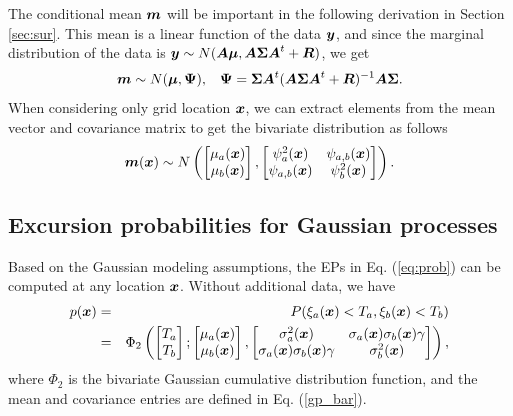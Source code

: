 \documentclass[aoas]{imsart}
\begin{document}
The conditional mean ${\boldsymbol m}$ will be important in the following derivation in Section \ref{sec:sur}. This mean is a linear function of the data ${\boldsymbol y}$, and since the marginal distribution of the data is ${\boldsymbol y} \sim N( {\boldsymbol A} {\boldsymbol \mu},{\boldsymbol A} {\boldsymbol \Sigma} {\boldsymbol A}^t+{\boldsymbol R})$, we get
\begin{equation}\label{distxi}
\bm \sim N(\bmu , \bPsi), \hspace{3mm} \bPsi=\bSigma \bA^t (\bA \bSigma \bA^t+\bR)^{-1} \bA \bSigma.  
\end{equation}
When considering only grid location ${\boldsymbol x}$, we can extract elements from the mean vector and covariance matrix to get the bivariate distribution as follows 
\begin{equation}\label{dist_mxi}
\bm(\bx) \sim N 
\left( 
\begin{bmatrix}
\mu_{a}(\bx) \\
\mu_{b}(\bx)
\end{bmatrix},
\begin{bmatrix}
\psi^2_{a}(\bx) & \psi_{a,b}(\bx)\\
\psi_{a,b}(\bx) & \psi^2_{b}(\bx)
\end{bmatrix}
\right).
\end{equation}


\subsection{Excursion probabilities for Gaussian processes}

Based on the Gaussian modeling assumptions, the EPs in Eq. (\ref{eq:prob}) can be computed at any location ${\boldsymbol x}$. Without additional data, we have
\begin{eqnarray}\label{eq:prob_mv0}
 p(\bx) &=& P(\xi_a(\bx) < T_a, \xi_b(\bx) < T_b) \nonumber \\
 &=& \Phi_2 \begin{pmatrix} 
\begin{bmatrix} T_a\\
T_b
\end{bmatrix};
\begin{bmatrix} \mu_{a}(\bx)\\
\mu_{b}(\bx)
\end{bmatrix},\begin{bmatrix}
\sigma_{a}^2(\bx) & \sigma_{a}(\bx)\sigma_{b}(\bx) \gamma  \\
\sigma_{a}(\bx)\sigma_{b}(\bx) \gamma  & \sigma_{b}^2(\bx)  
\end{bmatrix}\end{pmatrix},
\end{eqnarray}
where $\Phi_2$ is the bivariate Gaussian cumulative distribution function, and the mean and covariance entries are defined in Eq. (\ref{gp_bar}). 
\end{document}

